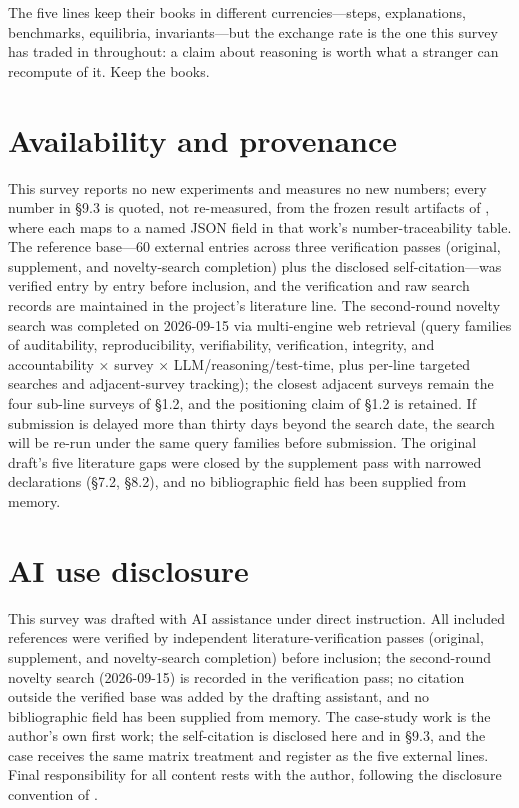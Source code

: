 \documentclass[11pt,a4paper]{article}
\begin{document}
The five lines keep their books in different currencies—steps, explanations, benchmarks, equilibria, invariants—but the exchange rate is the one this survey has traded in throughout: a claim about reasoning is worth what a stranger can recompute of it. Keep the books.

\section*{Availability and provenance}

This survey reports no new experiments and measures no new numbers; every number in §9.3 is quoted, not re-measured, from the frozen result artifacts of \cite{key04}, where each maps to a named JSON field in that work's number-traceability table. The reference base—60 external entries across three verification passes (original, supplement, and novelty-search completion) plus the disclosed self-citation—was verified entry by entry before inclusion, and the verification and raw search records are maintained in the project's literature line. The second-round novelty search was completed on 2026-09-15 via multi-engine web retrieval (query families of auditability, reproducibility, verifiability, verification, integrity, and accountability × survey × LLM/reasoning/test-time, plus per-line targeted searches and adjacent-survey tracking); the closest adjacent surveys remain the four sub-line surveys of §1.2, and the positioning claim of §1.2 is retained. If submission is delayed more than thirty days beyond the search date, the search will be re-run under the same query families before submission. The original draft's five literature gaps were closed by the supplement pass with narrowed declarations (§7.2, §8.2), and no bibliographic field has been supplied from memory.

\section*{AI use disclosure}

This survey was drafted with AI assistance under direct instruction. All included references were verified by independent literature-verification passes (original, supplement, and novelty-search completion) before inclusion; the second-round novelty search (2026-09-15) is recorded in the verification pass; no citation outside the verified base was added by the drafting assistant, and no bibliographic field has been supplied from memory. The case-study work \cite{key04} is the author's own first work; the self-citation is disclosed here and in §9.3, and the case receives the same matrix treatment and register as the five external lines. Final responsibility for all content rests with the author, following the disclosure convention of \cite{key04}.
\end{document}
